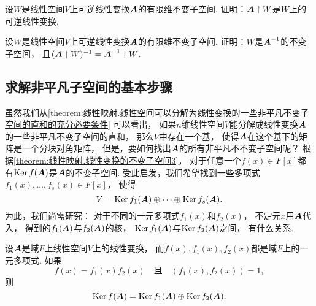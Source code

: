 \begin{example}
设\(W\)是线性空间\(V\)上可逆线性变换\(\boldsymbol{A}\)的有限维不变子空间.
证明：\(\boldsymbol{A} \upharpoonright W\)是\(W\)上的可逆线性变换.
\end{example}

\begin{example}
设\(W\)是线性空间\(V\)上可逆线性变换\(\boldsymbol{A}\)的有限维不变子空间.
证明：\(W\)是\(\boldsymbol{A}^{-1}\)的不变子空间，
且\((\boldsymbol{A} \upharpoonright W)^{-1}
= \boldsymbol{A}^{-1} \upharpoonright W\).
\end{example}

\subsection{求解非平凡子空间的基本步骤}
虽然我们从\cref{theorem:线性映射.线性空间可以分解为线性变换的一些非平凡不变子空间的直和的充分必要条件} 可以看出，
如果\(n\)维线性空间\(V\)能分解成线性变换\(\boldsymbol{A}\)的一些非平凡不变子空间的直和，
那么\(V\)中存在一个基，
使得\(\boldsymbol{A}\)在这个基下的矩阵是一个分块对角矩阵，
但是，要如何找出\(\boldsymbol{A}\)的所有非平凡不不变子空间呢？
根据\cref{theorem:线性映射.线性变换的不变子空间3}，
对于任意一个\(f(x) \in F[x]\)都有\(\operatorname{Ker} f(\boldsymbol{A})\)是\(\boldsymbol{A}\)的不变子空间.
受此启发，我们希望找到一些多项式\(f_1(x),\dotsc,f_s(x) \in F[x]\)，
使得\[
	V = \operatorname{Ker} f_1(\boldsymbol{A}) \oplus \dotsb \oplus \operatorname{Ker} f_s(\boldsymbol{A}).
\]
为此，我们尚需研究：
对于不同的一元多项式\(f_1(x)\)和\(f_2(x)\)，
不定元\(x\)用\(\boldsymbol{A}\)代入，
得到的\(f_1(\boldsymbol{A})\)与\(f_2(\boldsymbol{A})\)的核，
\(\operatorname{Ker} f_1(\boldsymbol{A})\)与\(\operatorname{Ker} f_2(\boldsymbol{A})\)之间，
有什么关系.
\begin{theorem}%
设\(\boldsymbol{A}\)是域\(F\)上线性空间\(V\)上的线性变换，
而\(f(x),f_1(x),f_2(x)\)都是域\(F\)上的一元多项式.
如果\[
	f(x) = f_1(x) f_2(x)
	\quad\text{且}\quad
	(f_1(x),f_2(x)) = 1,
\]
则\[
	\operatorname{Ker} f(\boldsymbol{A})
	= \operatorname{Ker} f_1(\boldsymbol{A})
	\oplus \operatorname{Ker} f_2(\boldsymbol{A}).
\]
\end{theorem}

